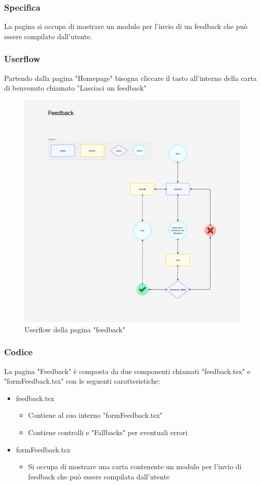 \documentclass{report}
\begin{document}
\subsubsection*{Specifica}
La pagina si occupa di mostrare un modulo per l'invio di un feedback che può essere compilato dall'utente.\\ 

\subsubsection*{Userflow}
Partendo dalla pagina "Homepage" bisogna cliccare il tasto all'interno della carta di benvenuto chiamato "Lasciaci un feedback"
\begin{figure}[H]
	\centering\includegraphics[width=1\textwidth]{images/microservizio-home/frontend/feedback-userflow.png}
	Userflow della pagina "feedback"
\end{figure}

\subsubsection*{Codice}
La pagina "Feedback" è composta da due componenti chiamati "feedback.tsx" e "formFeedback.tsx" con le seguenti caratteristiche:
\begin{itemize}
	\item feedback.tsx
	\begin{itemize}
		\item Contiene al suo interno "formFeedback.tsx"
		\item Contiene controlli e "Fallbacks" per eventuali errori
	\end{itemize}
	\item formFeedback.tsx
	\begin{itemize}
		\item Si occupa di mostrare una carta contenente un modulo per l'invio di feedback che può essere compilata dall'utente
	\end{itemize}
\end{itemize}
\end{document}
